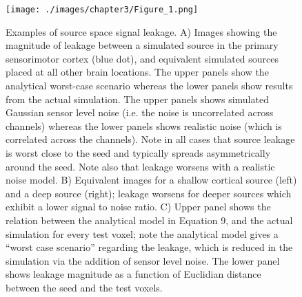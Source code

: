 \begin{figure}[h!]
	\begin{center}
		\texttt{[image: ./images/chapter3/Figure\_1.png]}\caption{Examples of source space signal leakage. A) Images showing the magnitude of leakage between a simulated source in the primary sensorimotor cortex (blue dot), and equivalent simulated sources placed at all other brain locations. The upper panels show the analytical worst-case scenario whereas the lower panels show results from the actual simulation. The upper panels shows simulated Gaussian sensor level noise (i.e. the noise is uncorrelated across channels) whereas the lower panels shows realistic noise (which is correlated across the channels). Note in all cases that source leakage is worst close to the seed and typically spreads asymmetrically around the seed. Note also that leakage worsens with a realistic noise model. B) Equivalent images for a shallow cortical source (left) and a deep source (right); leakage worsens for deeper sources which exhibit a lower signal to noise ratio. C) Upper panel shows the relation between the analytical model in Equation 9, and the actual simulation for every test voxel; note the analytical model gives a “worst case scenario” regarding the leakage, which is reduced in the simulation via the addition of sensor level noise. The lower panel shows leakage magnitude as a function of Euclidian distance between the seed and the test voxels.\label{figure_3_1}}
	\end{center}
\end{figure}
\clearpage

